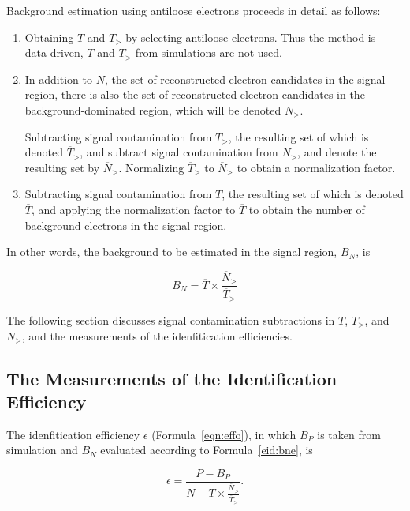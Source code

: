 Background estimation using antiloose electrons proceeds in detail as follows:

\begin{enumerate}

	\item Obtaining $T$ and $T_>$ by selecting antiloose electrons. Thus the method
	      is data-driven, $T$ and $T_>$ from simulations are not used.

	\item In addition to $N$, the set of reconstructed electron candidates in the
	      signal region, there is also the set of reconstructed electron candidates in the
	      background-dominated region, which will be denoted $N_>$.

	      Subtracting signal contamination from $T_>$, the resulting set of which is
	      denoted $\overline{T}_>$, and subtract signal contamination from $N_>$, and
	      denote the resulting set by $\overline{N}_>$. Normalizing $\overline{T}_>$ to
	      $\overline{N}_>$ to obtain a normalization factor.

	\item Subtracting signal contamination from $T$, the resulting set of which is
	      denoted $\overline{T}$, and applying the normalization factor to $\overline{T}$
	      to obtain the number of background electrons in the signal region.

\end{enumerate}

In other words, the background to be estimated in the signal region, $B_N$, is

\begin{equation}\label{eid:bne}
	B_N =  \overline{T} \times \frac{\overline{N}_>}{\overline{T}_>}
\end{equation}

The following section discusses signal contamination subtractions in $T$,
$T_>$, and $N_>$, and the measurements of the idenfitication efficiencies.

\subsection{The Measurements of the Identification Efficiency}\label{s:meffs}

The idenfitication efficiency $\epsilon$ (Formula~\ref{eqn:effo}), in which
$B_P$ is taken from simulation and $B_N$ evaluated according to
Formula~\ref{eid:bne}, is


\begin{equation}\label{eid:efff}
	\epsilon = \frac{P-B_P}{N - \overline{T} \times \frac{\overline{N}_>}{\overline{T}_>}}.
\end{equation}


